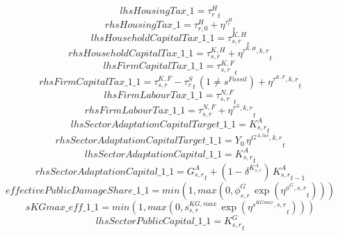 \begin{dmath*}
lhsHousingTax\_1 = {{\tau^{H}_{r}}}_{t}
\end{dmath*}
\begin{dmath*}
rhsHousingTax\_1 = {{\tau^{H}_{r,0}}}+{{\eta^{\tau^H_{r}}}}_{t}
\end{dmath*}
\begin{dmath*}
lhsHouseholdCapitalTax\_1\_1 = {{\tau^{K,H}_{s,r}}}_{t}
\end{dmath*}
\begin{dmath*}
rhsHouseholdCapitalTax\_1\_1 = {{\tau^{K,H}_{s,r}}}+{{\eta^{\tau^{K,H},k,r}}}_{t}
\end{dmath*}
\begin{dmath*}
lhsFirmCapitalTax\_1\_1 = {{\tau^{K,F}_{s,r}}}_{t}
\end{dmath*}
\begin{dmath*}
rhsFirmCapitalTax\_1\_1 = {{\tau^{K,F}_{s,r}}}-{{\tau^{S}_{r}}}_{t}\, \left(1\neq {{s^{Fossil}}}\right)+{{\eta^{\tau^{K,F},k,r}}}_{t}
\end{dmath*}
\begin{dmath*}
lhsFirmLabourTax\_1\_1 = {{\tau^{N,F}_{s,r}}}_{t}
\end{dmath*}
\begin{dmath*}
rhsFirmLabourTax\_1\_1 = {{\tau^{N,F}_{s,r}}}+{{\eta^{\tau^{N},k,r}}}_{t}
\end{dmath*}
\begin{dmath*}
lhsSectorAdaptationCapitalTarget\_1\_1 = {{K^{A}_{s,r}}}_{t}
\end{dmath*}
\begin{dmath*}
rhsSectorAdaptationCapitalTarget\_1\_1 = {{Y_0}}\, {{\eta^{G^{A,tas},k,r}}}_{t}
\end{dmath*}
\begin{dmath*}
lhsSectorAdaptationCapital\_1\_1 = {{K^{A}_{s,r}}}_{t}
\end{dmath*}
\begin{dmath*}
rhsSectorAdaptationCapital\_1\_1 = {{G^{A}_{s,r}}}_{t}+\left(1-{{\delta^{K^{A}_{s,r}}}}\right)\, {{K^{A}_{s,r}}}_{t-1}
\end{dmath*}
\begin{dmath*}
effectivePublicDamageShare\_1\_1 = min(1,max(0,{{\phi^{G}_{s,r}}}\, \exp\left({{\eta^{\phi^{G},s,r}}}_{t}\right)))
\end{dmath*}
\begin{dmath*}
sKGmax\_eff\_1\_1 = min(1,max(0,{{s^{KG,max}_{s,r}}}\, \exp\left({{\eta^{s^{KGmax},s,r}}}_{t}\right)))
\end{dmath*}
\begin{dmath*}
lhsSectorPublicCapital\_1\_1 = {{K^G_{s,r}}}_{t}
\end{dmath*}
